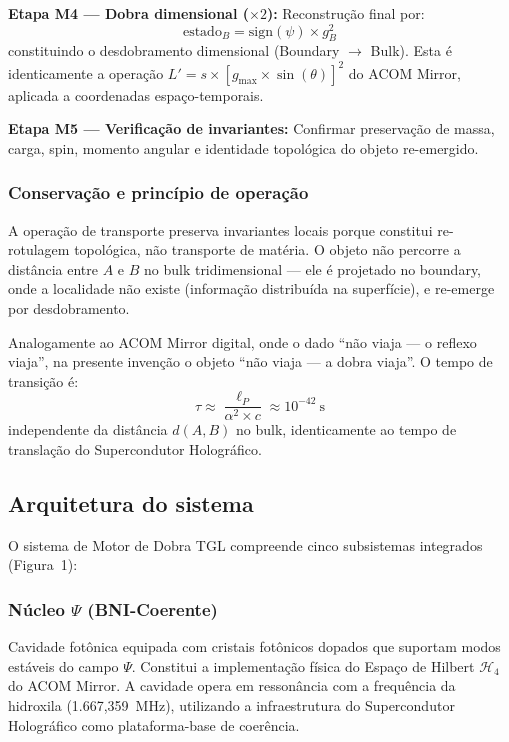 \documentclass[12pt,a4paper]{article}
\newcommand{\alphaii}{\alpha^2}
\begin{document}
\textbf{Etapa M4 --- Dobra dimensional ($\times 2$):}
Reconstrução final por:
\begin{equation}
\text{estado}_B = \text{sign}(\psi) \times g_B^2
\end{equation}
constituindo o desdobramento dimensional (Boundary $\to$ Bulk).
Esta é identicamente a operação $L' = s \times
[g_{\max} \times \sin(\theta)]^2$ do ACOM Mirror, aplicada a
coordenadas espaço-temporais.

\textbf{Etapa M5 --- Verificação de invariantes:} Confirmar
preservação de massa, carga, spin, momento angular e
identidade topológica do objeto re-emergido.

\subsubsection{Conservação e princípio de operação}

A operação de transporte preserva invariantes locais porque
constitui re-rotulagem topológica, não transporte de matéria.
O objeto não percorre a distância entre $A$ e $B$ no bulk
tridimensional --- ele é projetado no boundary, onde a
localidade não existe (informação distribuída na superfície),
e re-emerge por desdobramento.

Analogamente ao ACOM Mirror digital, onde o dado ``não viaja
--- o reflexo viaja'', na presente invenção o objeto ``não
viaja --- a dobra viaja''. O tempo de transição é:
\begin{equation}
\tau \approx \frac{\ell_P}{\alphaii \times c}
  \approx 10^{-42}~\text{s}
\end{equation}
independente da distância $d(A,B)$ no bulk, identicamente
ao tempo de translação do Supercondutor Holográfico.

\subsection{Arquitetura do sistema}

O sistema de Motor de Dobra TGL compreende cinco subsistemas
integrados (Figura~1):

\subsubsection{Núcleo $\Psi$ (BNI-Coerente)}

Cavidade fotônica equipada com cristais fotônicos dopados que
suportam modos estáveis do campo $\Psi$. Constitui a
implementação física do Espaço de Hilbert $\mathcal{H}_4$ do
ACOM Mirror. A cavidade opera em ressonância com a frequência
da hidroxila (1.667,359~MHz), utilizando a infraestrutura do
Supercondutor Holográfico como plataforma-base de coerência.
\end{document}
